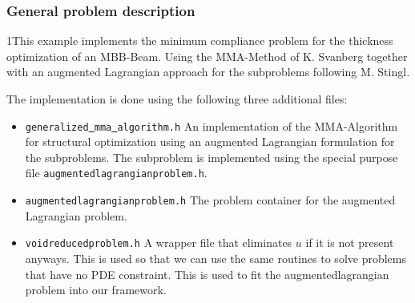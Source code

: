 \subsubsection{General problem description}
1This example implements the minimum compliance problem for the thickness optimization 
of an MBB-Beam. Using the MMA-Method of K. Svanberg together with an augmented Lagrangian 
approach for the subproblems following M. Stingl.

The implementation is done using the following three additional files:

\begin{itemize}
\item \texttt{generalized\underline{ }mma\underline{ }algorithm.h}
  An implementation of the MMA-Algorithm for structural optimization using an augmented
  Lagrangian formulation for the subproblems. The subproblem is implemented using the 
  special purpose file \texttt{augmentedlagrangianproblem.h}.
\item \texttt{augmentedlagrangianproblem.h} The problem container 
  for the augmented Lagrangian problem.
\item \texttt{voidreducedproblem.h} A wrapper file that eliminates $u$ 
  if it is not present anyways. This is used so that we can use the same routines to 
  solve problems that have no PDE constraint. This is used to fit the augmentedlagrangian 
  problem into our framework.
\end{itemize}